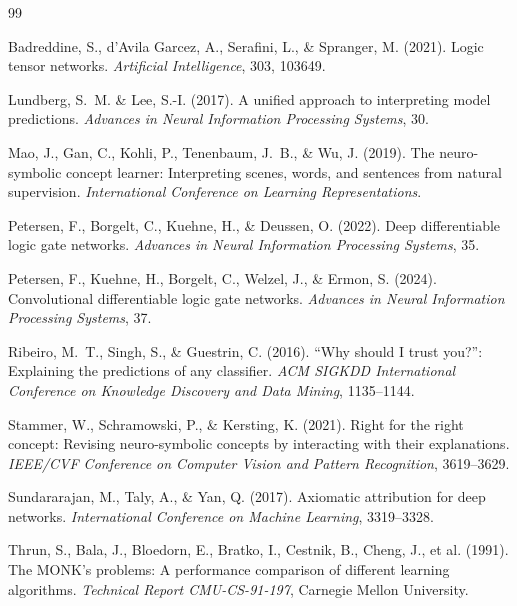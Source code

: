 \documentclass{article}
\begin{document}
\begin{thebibliography}{99}

Badreddine, S., d'Avila Garcez, A., Serafini, L., \& Spranger, M. (2021).
\newblock Logic tensor networks.
\newblock \emph{Artificial Intelligence}, 303, 103649.

Lundberg, S.~M. \& Lee, S.-I. (2017).
\newblock A unified approach to interpreting model predictions.
\newblock \emph{Advances in Neural Information Processing Systems}, 30.

Mao, J., Gan, C., Kohli, P., Tenenbaum, J.~B., \& Wu, J. (2019).
\newblock The neuro-symbolic concept learner: Interpreting scenes, words, and sentences from natural supervision.
\newblock \emph{International Conference on Learning Representations}.

Petersen, F., Borgelt, C., Kuehne, H., \& Deussen, O. (2022).
\newblock Deep differentiable logic gate networks.
\newblock \emph{Advances in Neural Information Processing Systems}, 35.

Petersen, F., Kuehne, H., Borgelt, C., Welzel, J., \& Ermon, S. (2024).
\newblock Convolutional differentiable logic gate networks.
\newblock \emph{Advances in Neural Information Processing Systems}, 37.

Ribeiro, M.~T., Singh, S., \& Guestrin, C. (2016).
\newblock ``{Why} should {I} trust you?'': Explaining the predictions of any classifier.
\newblock \emph{ACM SIGKDD International Conference on Knowledge Discovery and Data Mining}, 1135--1144.

Stammer, W., Schramowski, P., \& Kersting, K. (2021).
\newblock Right for the right concept: Revising neuro-symbolic concepts by interacting with their explanations.
\newblock \emph{IEEE/CVF Conference on Computer Vision and Pattern Recognition}, 3619--3629.

Sundararajan, M., Taly, A., \& Yan, Q. (2017).
\newblock Axiomatic attribution for deep networks.
\newblock \emph{International Conference on Machine Learning}, 3319--3328.

Thrun, S., Bala, J., Bloedorn, E., Bratko, I., Cestnik, B., Cheng, J., et al. (1991).
\newblock The {MONK}'s problems: A performance comparison of different learning algorithms.
\newblock \emph{Technical Report CMU-CS-91-197}, Carnegie Mellon University.

\end{thebibliography}
\end{document}
